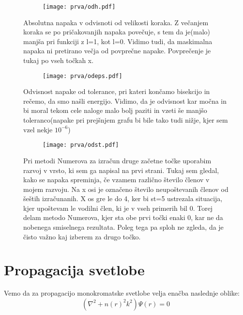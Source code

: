 \documentclass{article}
\begin{document}
\begin{figure}[H]
\centering
\begin{subfigure}{.7\textwidth}
\texttt{[image: prva/odh.pdf]}
\end{subfigure}
\caption*{Absolutna napaka v odvisnoti od velikosti koraka. Z večanjem koraka se po pričakovanjih napaka povečuje, s tem da je(malo) manjša pri funkciji z l=1, kot l=0. Vidimo tudi, da maskimalna napaka ni pretirano  večja od povprečne napake. Povprečenje je tukaj po vseh točkah x.}
\end{figure}


\begin{figure}[H]
\centering
\begin{subfigure}{.7\textwidth}
\texttt{[image: prva/odeps.pdf]}
\end{subfigure}
\caption*{Odvisnost napake od tolerance, pri kateri končamo bisekcijo in rečemo, da smo našli energijo. Vidimo, da je odvisnost kar močna in bi moral tekom cele naloge malo bolj paziti in vzeti še manjšo toleranco(napake pri prejšnjem grafu bi bile tako tudi nižje, kjer sem vzel nekje $10^{-6}$)}
\end{figure}

\begin{figure}[H]
\centering
\begin{subfigure}{.7\textwidth}
\texttt{[image: prva/odst.pdf]}
\end{subfigure}
\caption*{Pri metodi Numerova za izračun druge začetne točke uporabim razvoj v vrsto, ki sem ga napisal na prvi strani. Tukaj sem gledal, kako se napaka spreminja, če vzamem različno število členov v mojem razvoju. Na x osi je označeno število neupoštevanih členov od šeštih izračunanih. X os gre le do 4, ker bi st=5 ustrezala situacija, kjer upoštevam le vodilni člen, ki je v vseh primerih bil 0. Torej delam metodo Numerova, kjer sta obe prvi točki enaki 0, kar ne da nobenega smiselnega rezultata. Poleg tega pa sploh ne zgleda, da je čisto važno kaj izberem za drugo točko.}
\end{figure}


\newpage
\section{Propagacija svetlobe}

Vemo da za propagacijo monokromatske svetlobe velja enačba naslednje oblike:
\begin{equation*}
(\nabla^2 + n(r)^2 k^2) \Psi (r) = 0
\end{equation*}
\end{document}
